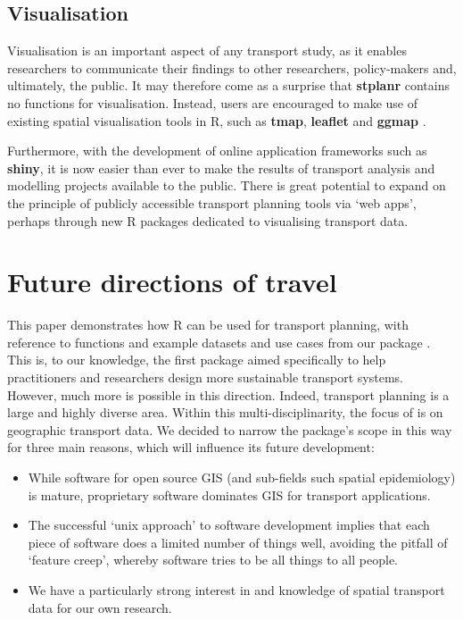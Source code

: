 \subsection{Visualisation}\label{visualisation}

Visualisation is an important aspect of any transport study, as it
enables researchers to communicate their findings to other researchers,
policy-makers and, ultimately, the public. It may therefore come as a
surprise that \textbf{stplanr} contains no functions for visualisation.
Instead, users are encouraged to make use of existing spatial
visualisation tools in R, such as \textbf{tmap}, \textbf{leaflet} and
\textbf{ggmap} \citep{cheshire_spatial_2015,kahle_ggmap:_2013}.

Furthermore, with the development of online application frameworks such
as \textbf{shiny}, it is now easier than ever to make the results of
transport analysis and modelling projects available to the public.
There is great potential to expand on
the principle of publicly accessible transport planning tools via `web
apps', perhaps through new R packages dedicated to visualising transport
data.

\section{Future directions of travel}\label{future-directions-of-travel}

This paper demonstrates how R can be used for transport planning, with reference to functions and example datasets and use cases from our package .
This is, to our knowledge, the first package aimed specifically to help practitioners and researchers design more sustainable transport systems.
However, much more is possible in this direction.
Indeed, transport planning is a large and highly diverse area.
Within this multi-disciplinarity, the focus of  is on geographic transport data.
We decided to narrow the package's scope in this way for three main reasons, which will influence its future development:

\begin{itemize}
\tightlist
  \item While software for open source GIS (and sub-fields such spatial epidemiology) is mature,  proprietary software dominates GIS for transport applications.
  \item The successful `unix approach' to software development implies that each piece of software does a limited number of things well, avoiding the pitfall of `feature creep', whereby software tries to be all things to all people.
  \item We have a particularly strong interest in and knowledge of spatial transport data for our own research.
\end{itemize}


